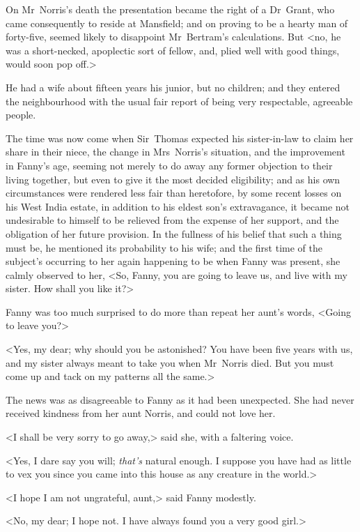 On Mr~Norris's death the presentation became the right of a Dr~Grant, who came consequently to reside at Mansfield; and on proving to be a hearty man of forty-five, seemed likely to disappoint Mr~Bertram's calculations. But <no, he was a short-necked, apoplectic sort of fellow, and, plied well with good things, would soon pop off.>

He had a wife about fifteen years his junior, but no children; and they entered the neighbourhood with the usual fair report of being very respectable, agreeable people.

The time was now come when Sir~Thomas expected his sister-in-law to claim her share in their niece, the change in Mrs~Norris's situation, and the improvement in Fanny's age, seeming not merely to do away any former objection to their living together, but even to give it the most decided eligibility; and as his own circumstances were rendered less fair than heretofore, by some recent losses on his West India estate, in addition to his eldest son's extravagance, it became not undesirable to himself to be relieved from the expense of her support, and the obligation of her future provision. In the fullness of his belief that such a thing must be, he mentioned its probability to his wife; and the first time of the subject's occurring to her again happening to be when Fanny was present, she calmly observed to her, <So, Fanny, you are going to leave us, and live with my sister. How shall you like it?>

Fanny was too much surprised to do more than repeat her aunt's words, <Going to leave you?>

<Yes, my dear; why should you be astonished? You have been five years with us, and my sister always meant to take you when Mr~Norris died. But you must come up and tack on my patterns all the same.>

The news was as disagreeable to Fanny as it had been unexpected. She had never received kindness from her aunt Norris, and could not love her.

<I shall be very sorry to go away,> said she, with a faltering voice.

<Yes, I dare say you will; \textit{that's}  natural enough. I suppose you have had as little to vex you since you came into this house as any creature in the world.>

<I hope I am not ungrateful, aunt,> said Fanny modestly.

<No, my dear; I hope not. I have always found you a very good girl.>


